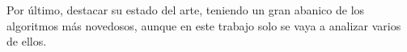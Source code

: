 \documentclass[11pt,fleqn]{book} %
\begin{document}
Por último, destacar su estado del arte, teniendo un gran abanico de los algoritmos más novedosos, aunque en este trabajo solo se vaya a analizar varios de ellos.

%
%
%
%
%
%
\end{document}
